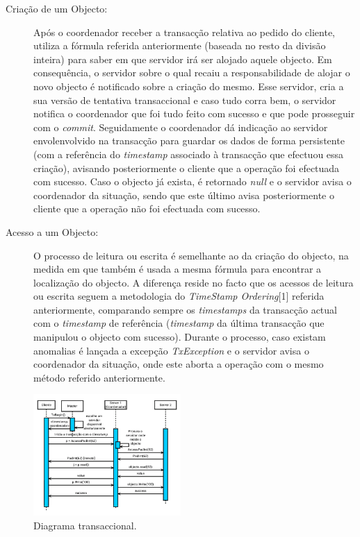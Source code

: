 \begin{description}
\item[Criação de um Objecto:] Após o coordenador receber a transacção relativa ao pedido do cliente, utiliza a fórmula referida anteriormente (baseada no resto da divisão inteira) para saber em que servidor irá ser alojado aquele objecto. Em consequência, o servidor sobre o qual recaiu a responsabilidade de alojar o novo objecto é notificado sobre a criação do mesmo. Esse servidor, cria a sua versão de tentativa transaccional e caso tudo corra bem, o servidor notifica o coordenador que foi tudo feito com sucesso e que pode prosseguir com o \textit{commit}. Seguidamente o coordenador dá indicação ao servidor envolenvolvido na transacção para guardar os dados de forma persistente (com a referência do \textit{timestamp} associado à transacção que efectuou essa criação), avisando posteriormente o cliente que a operação foi efectuada com sucesso. Caso o objecto já exista, é retornado \textit{null} e o servidor avisa o coordenador da situação, sendo que este último avisa posteriormente o cliente que a operação não foi efectuada com sucesso.

\item[Acesso a um Objecto:] O processo de leitura ou escrita é semelhante ao da criação do objecto, na medida em que também é usada a mesma fórmula para encontrar a localização do objecto. A diferença reside no facto que os acessos de leitura ou escrita seguem a metodologia do \textit{TimeStamp Ordering}[1] referida anteriormente, comparando sempre os \textit{timestamps} da transacção actual com o \textit{timestamp} de referência (\textit{timestamp} da última transacção que manipulou o objecto com sucesso). Durante o processo, caso existam anomalias é lançada a excepção \textit{TxException} e o servidor avisa o coordenador da situação, onde este aborta a operação com o mesmo método referido anteriormente.
\end{description}

\begin{figure}
\centering
\includegraphics[width=0.5\textwidth]{transaccao.png}
\caption{\label{fig:transaccao}Diagrama transaccional.}
\end{figure}